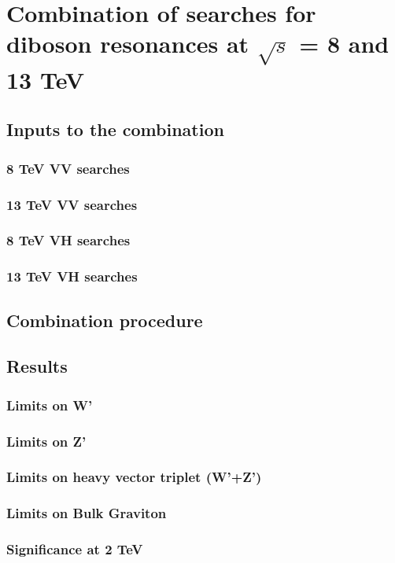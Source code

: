 \chapter{Combination of searches for diboson resonances at $\sqrt{s}$ = 8 and 13 TeV}
\label{ch:combination}

\section{Inputs to the combination}
\subsection{8 TeV VV searches}
\subsection{13 TeV VV searches}
\subsection{8 TeV VH searches}
\subsection{13 TeV VH searches}

\section{Combination procedure}

\section{Results}
\subsection{Limits on W'}
\subsection{Limits on Z'}
\subsection{Limits on heavy vector triplet (W'+Z')}
\subsection{Limits on Bulk Graviton}
\subsection{Significance at 2 TeV}
